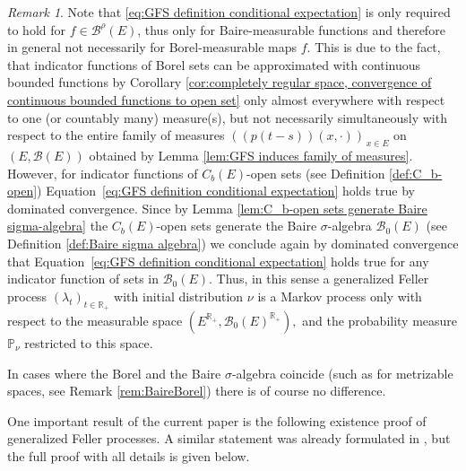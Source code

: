 \documentclass[a4paper,12pt]{article}
\theoremstyle{definition}
\theoremstyle{remark}
\newtheorem{remark}[theorem]{Remark}
\numberwithin{equation}{section}
\numberwithin{theorem}{section}
\begin{document}
\begin{remark}
\label{rem:generalized Feller process not Markov}
Note that  \ref{eq:GFS definition conditional expectation} is only required to hold for $f\in\mathscr{B}^{\rho}(E)$, thus only for Baire-measurable functions and therefore in general not necessarily for Borel-measurable
maps $f$. This is due to the fact, that indicator functions of Borel
sets can be approximated with continuous bounded functions by Corollary
\ref{cor:completely regular space, convergence of continuous bounded functions to open set}
only almost everywhere with respect to one (or countably many) measure(s),
but not necessarily simultaneously with respect to the entire family
of measures $\left(\left(p(t-s)\right)(x,\cdot)\right)_{\,x\in E}$
on $\left(E,\mathcal{B}(E)\right)$ obtained by Lemma \ref{lem:GFS induces family of measures}.
However, for indicator functions of $C_{b}(E)$-open sets
(see Definition \ref{def:C_b-open})  Equation~\eqref{eq:GFS definition conditional expectation}
holds true by dominated convergence. Since by Lemma \ref{lem:C_b-open sets generate Baire sigma-algebra}
the $C_{b}(E)$-open sets generate the Baire $\sigma$-algebra $\mathcal{B}_{0}(E)$
(see Definition \ref{def:Baire sigma algebra}) we conclude again
by dominated convergence that  Equation~\eqref{eq:GFS definition conditional expectation}
holds true for any indicator function of sets in $\mathcal{B}_{0}(E)$.
Thus, in this sense a generalized Feller process $\left(\lambda_{t}\right)_{t\in\mathbb{R}_{+}}$
 with initial distribution $\nu$ is a Markov process only with respect to the measurable space 
$
(E^{\mathbb{R}_{+}},\mathcal{B}_{0}(E)^{\mathbb{R}_{+}}),
$
and the probability measure $\mathbb{P}_{\nu}$
restricted to this space.

In cases where the Borel and the Baire $\sigma$-algebra coincide (such as for metrizable spaces, see Remark \ref{rem:BaireBorel}) there is of course no difference.
\end{remark}

One important result of the current paper is the following existence proof of generalized Feller processes. A similar statement was already formulated in \cite[Theorem 2.11]{CuT}, but the full proof with all details is given below.
\end{document}
